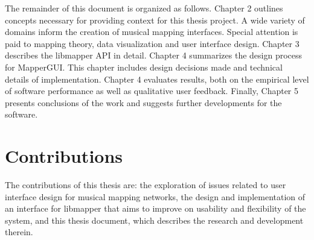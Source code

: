 The remainder of this document is organized as follows. Chapter 2 outlines concepts necessary for providing context for this thesis project. A wide variety of domains inform the creation of musical mapping interfaces. Special attention is paid to mapping theory, data visualization and user interface design. Chapter 3 describes the libmapper API in detail. Chapter 4 summarizes the design process for MapperGUI. This chapter includes design decisions made and technical details of implementation. Chapter 4 evaluates results, both on the empirical level of software performance as well as qualitative user feedback. Finally, Chapter 5 presents conclusions of the work and suggests further developments for the software.

\section{Contributions}

The contributions of this thesis are: the exploration of issues related to user interface design for musical mapping networks, the design and implementation of an interface for libmapper that aims to improve on usability and flexibility of the system, and this thesis document, which describes the research and development therein.

